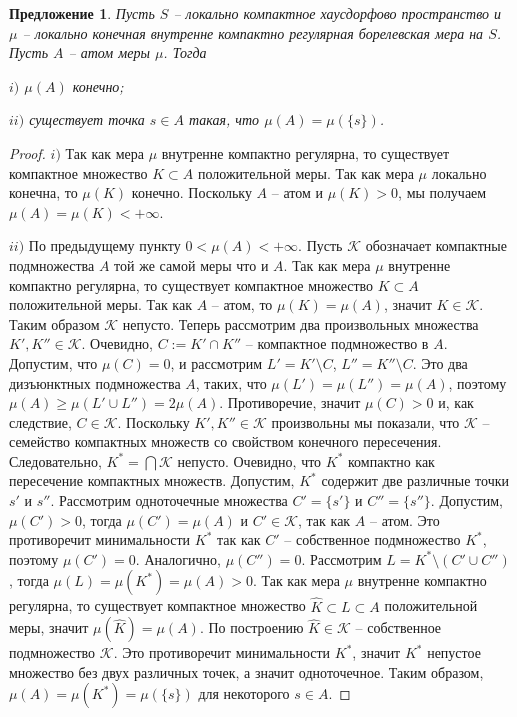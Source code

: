 \documentclass[12pt]{article}
\newtheorem{proposition}[theorem]{Предложение}
\begin{document}
\begin{proposition}\label{MeasAtomCharac} Пусть $S$ -- локально компактное хаусдорфово пространство и $\mu$ -- локально конечная внутренне компактно регулярная борелевская мера на $S$. Пусть $A$ -- атом меры $\mu$. Тогда

    $i)$ $\mu(A)$ конечно;

    $ii)$ существует точка $s\in A$ такая, что $\mu(A)=\mu(\{s\})$.
\end{proposition}
\begin{proof} $i)$ Так как мера $\mu$ внутренне компактно регулярна, то существует компактное множество $K\subset A$ положительной меры. Так как мера $\mu$ локально конечна, то $\mu(K)$ конечно. Поскольку $A$ -- атом и $\mu(K)>0$, мы получаем $\mu(A)=\mu(K)<+\infty$.

    $ii)$ По предыдущему пункту $0<\mu(A)<+\infty$. Пусть $\mathcal{K}$ обозначает компактные подмножества $A$ той же самой меры что и $A$. Так как мера $\mu$ внутренне компактно регулярна, то существует компактное множество $K\subset A$ положительной меры. Так как $A$ -- атом, то $\mu(K)=\mu(A)$, значит $K\in\mathcal{K}$. Таким образом $\mathcal{K}$ непусто. Теперь рассмотрим два произвольных множества $K',K''\in\mathcal{K}$. Очевидно, $C:=K'\cap K''$ -- компактное подмножество в $A$. Допустим, что $\mu(C)=0$, и рассмотрим $L'=K'\setminus C$, $L''=K''\setminus C$. Это два дизъюнктных  подмножества $A$, таких, что $\mu(L')=\mu(L'')=\mu(A)$, поэтому $\mu(A)\geq \mu(L'\cup L'')=2\mu(A)$. Противоречие, значит $\mu(C)>0$ и, как следствие, $C\in\mathcal{K}$. Поскольку $K', K''\in \mathcal{K}$ произвольны мы показали, что $\mathcal{K}$ -- семейство компактных множеств со свойством конечного пересечения. Следовательно, $K^*=\bigcap\mathcal{K}$ непусто. Очевидно, что $K^*$ компактно как пересечение компактных множеств. Допустим, $K^*$ содержит две различные точки $s'$ и $s''$. Рассмотрим одноточечные множества $C'=\{s'\}$ и $C''=\{s''\}$. Допустим, $\mu(C')>0$, тогда $\mu(C')=\mu(A)$ и $C'\in\mathcal{K}$, так как $A$ -- атом. Это противоречит минимальности $K^*$ так как $C'$ -- собственное подмножество $K^*$, поэтому $\mu(C')=0$. Аналогично, $\mu(C'')=0$. Рассмотрим $L=K^*\setminus (C'\cup C'')$, тогда $\mu(L)=\mu(K^*)=\mu(A)>0$. Так как мера $\mu$ внутренне компактно регулярна, то существует компактное множество $\hat{K}\subset L\subset A$ положительной меры, значит $\mu(\hat{K})=\mu(A)$. По построению $\hat{K}\in\mathcal{K}$ -- собственное подмножество $\mathcal{K}$. Это противоречит минимальности $K^*$, значит $K^*$ непустое множество без двух различных точек, а значит одноточечное. Таким образом, $\mu(A)=\mu(K^*)=\mu(\{s\})$ для некоторого $s\in A$.
\end{proof}
\end{document}
